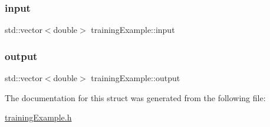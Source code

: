 \subsubsection{\texorpdfstring{input}{input}}
{\footnotesize\ttfamily std\+::vector$<$double$>$ training\+Example\+::input}

\mbox{\label{structtraining_example_ae776963ea692ba5260d4d329f579c9fd}} 
\subsubsection{\texorpdfstring{output}{output}}
{\footnotesize\ttfamily std\+::vector$<$double$>$ training\+Example\+::output}



The documentation for this struct was generated from the following file\+:\begin{DoxyCompactItemize}
\item 
\hyperlink{training_example_8h}{training\+Example.\+h}\end{DoxyCompactItemize}
